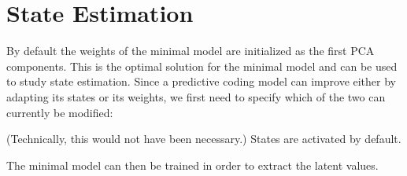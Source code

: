 \documentclass[letterpaper,10pt,english]{sphinxmanual}
\begin{document}
\section{State Estimation}
\label{\detokenize{usage/minimal_model:State-Estimation}}
By default the weights of the minimal model are initialized as the first PCA components. This is the optimal solution for the minimal model and can be used to study state estimation. Since a predictive coding model can improve either by adapting its states or its weights, we first need to specify which of the two can currently be modified:

{
\begin{sphinxVerbatim}[commandchars=\\\{\}]
\llap{\color{nbsphinxin}[5]:\,\hspace{\fboxrule}\hspace{\fboxsep}}
\end{sphinxVerbatim}
}

(Technically, this would not have been necessary.) States are activated by default.

The minimal model can then be trained in order to extract the latent values.

{
\begin{sphinxVerbatim}[commandchars=\\\{\}]
\llap{\color{nbsphinxin}[6]:\,\hspace{\fboxrule}\hspace{\fboxsep}}
\end{sphinxVerbatim}
}
\end{document}
